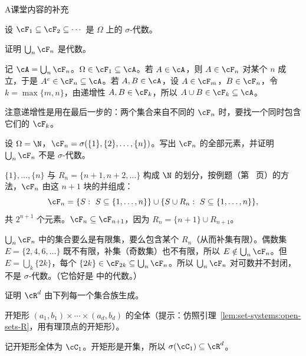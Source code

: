 \begin{exercises}{A}{课堂内容的补充}
\item\label{ex:set-systems:A4} 设 $\cF_1\subseteq\cF_2\subseteq\cdots$ 是 $\Omega$ 上的 $\sigma$-代数。
\begin{questions}
\item 证明 $\bigcup_n\cF_n$ 是代数。
\begin{solution}
记 $\cA=\bigcup_n\cF_n$。$\Omega\in\cF_1\subseteq\cA$。若 $A\in\cA$，则 $A\in\cF_n$ 对某个 $n$ 成立，于是 $A^c\in\cF_n\subseteq\cA$。若 $A,B\in\cA$，设 $A\in\cF_m$，$B\in\cF_n$，令 $k=\max\{m,n\}$，由递增性 $A,B\in\cF_k$，所以 $A\cup B\in\cF_k\subseteq\cA$。

注意递增性是用在最后一步的：两个集合来自不同的 $\cF_n$ 时，要找一个同时包含它们的 $\cF_k$。
\end{solution}
\item 设 $\Omega=\N$，$\cF_n=\sigma(\{1\},\{2\},\dots,\{n\})$。写出 $\cF_n$ 的全部元素，并证明 $\bigcup_n\cF_n$ 不是 $\sigma$-代数。
\begin{solution}
$\{1\},\dots,\{n\}$ 与 $R_n=\{n+1,n+2,\dots\}$ 构成 $\N$ 的划分，按例题（第~\pageref{we:set-systems:two-sets} 页）的方法，$\cF_n$ 由这 $n+1$ 块的并组成：
\[
\cF_n=\{S:\ S\subseteq\{1,\dots,n\}\}\cup\{S\cup R_n:\ S\subseteq\{1,\dots,n\}\},
\]
共 $2^{n+1}$ 个元素。$\cF_n\subseteq\cF_{n+1}$，因为 $R_n=\{n+1\}\cup R_{n+1}$。

$\bigcup_n\cF_n$ 中的集合要么是有限集，要么包含某个 $R_n$（从而补集有限）。偶数集 $E=\{2,4,6,\dots\}$ 既不有限，补集（奇数集）也不有限，所以 $E\notin\bigcup_n\cF_n$。但 $E=\bigcup_k\{2k\}$，每个 $\{2k\}\in\cF_{2k}\subseteq\bigcup_n\cF_n$。所以 $\bigcup_n\cF_n$ 对可数并不封闭，不是 $\sigma$-代数。（它恰好是 中的代数。）
\end{solution}
\end{questions}

\item\label{ex:set-systems:A5} 证明 $\cR^d$ 由下列每一个集合族生成。
\begin{questions}
\item 开矩形 $(a_1,b_1)\times\cdots\times(a_d,b_d)$ 的全体（提示：仿照引理~\ref{lem:set-systems:open-sets-R}，用有理顶点的开矩形）。
\begin{solution}
记开矩形全体为 $\cC_1$。开矩形是开集，所以 $\sigma(\cC_1)\subseteq\cR^d$。


\end{solution}
\end{questions}
\end{exercises}
